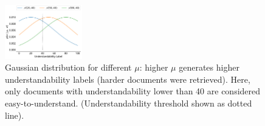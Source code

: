 %
%

\begin{figure}[t!]
  \centering
   \includegraphics[width=0.30\textwidth]{figs/gaussians}
    \vspace{-.2cm}
    \caption{Gaussian distribution for different $\mu$: higher $\mu$ generates higher understandability labels (harder documents were retrieved). Here, only documents with understandability lower than 40 are considered easy-to-understand. (Understandability threshold shown as dotted line). \vspace{-16pt}}
  \label{fig:gaussians}
\end{figure}


